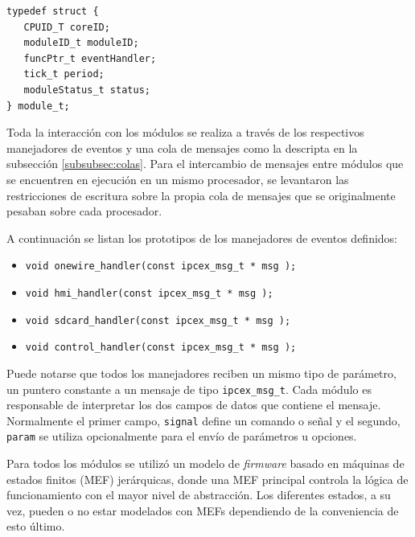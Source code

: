 \vspace{10px}

\begin{lstlisting}[caption={Definición de un nuevo tipo de dato module\_t.},label={lst:module_t}]
typedef struct {
   CPUID_T coreID;
   moduleID_t moduleID;
   funcPtr_t eventHandler;
   tick_t period;
   moduleStatus_t status;
} module_t;
\end{lstlisting}

\vspace{10px}

Toda la interacción con los módulos se realiza a través de los respectivos manejadores de eventos y una cola de mensajes como la descripta en la subsección \ref{subsubsec:colas}. Para el intercambio de mensajes entre módulos que se encuentren en ejecución en un mismo procesador, se levantaron las restricciones de escritura sobre la propia cola de mensajes que se originalmente pesaban sobre cada procesador.

A continuación se listan los prototipos de los manejadores de eventos definidos:

\vspace{10px}

\begin{itemize}
  \item \texttt{void onewire\_handler(const ipcex\_msg\_t * msg );} 
  \item \texttt{void hmi\_handler(const ipcex\_msg\_t * msg );} 
  \item \texttt{void sdcard\_handler(const ipcex\_msg\_t * msg );} 
  \item \texttt{void control\_handler(const ipcex\_msg\_t * msg );} 
\end{itemize}

\vspace{10px}

Puede notarse que todos los manejadores reciben un mismo tipo de parámetro, un puntero constante a un mensaje de tipo \texttt{ipcex\_msg\_t}.  Cada módulo es responsable de interpretar los dos campos de datos que contiene el mensaje.  Normalmente el primer campo, \texttt{signal} define un comando o señal y el segundo, \texttt{param} se utiliza opcionalmente para el envío de parámetros u opciones.

Para todos los módulos se utilizó un modelo de \textit{firmware} basado en máquinas de estados finitos (MEF) jerárquicas, donde una MEF principal controla la lógica de funcionamiento con el mayor nivel de abstracción. Los diferentes estados, a su vez, pueden o no estar modelados con MEFs dependiendo de la conveniencia de esto último.

